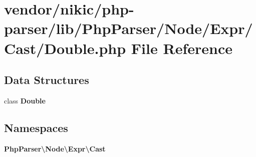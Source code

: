 \section{vendor/nikic/php-\/parser/lib/\+Php\+Parser/\+Node/\+Expr/\+Cast/\+Double.php File Reference}
\label{_double_8php}
\subsection*{Data Structures}
\begin{DoxyCompactItemize}
\item 
class {\bf Double}
\end{DoxyCompactItemize}
\subsection*{Namespaces}
\begin{DoxyCompactItemize}
\item 
 {\bf Php\+Parser\textbackslash{}\+Node\textbackslash{}\+Expr\textbackslash{}\+Cast}
\end{DoxyCompactItemize}
